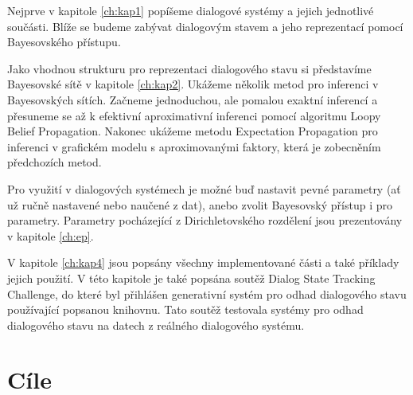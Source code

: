 Nejprve v kapitole \ref{ch:kap1} popíšeme dialogové systémy a jejich jednotlivé součásti.
Blíže se budeme zabývat dialogovým stavem a jeho reprezentací pomocí Bayesovského přístupu.

Jako vhodnou strukturu pro reprezentaci dialogového stavu si představíme Bayesovské sítě v kapitole \ref{ch:kap2}.
Ukážeme několik metod pro inferenci v Bayesovských sítích.
Začneme jednoduchou, ale pomalou exaktní inferencí a přesuneme se až k efektivní aproximativní inferenci pomocí algoritmu Loopy Belief Propagation.
Nakonec ukážeme metodu Expectation Propagation pro inferenci v grafickém modelu s aproximovanými faktory, která je zobecněním předchozích metod.

Pro využití v dialogových systémech je možné buď nastavit pevné parametry (ať už ručně nastavené nebo naučené z dat), anebo zvolit Bayesovský přístup i pro parametry.
Parametry pocházející z Dirichletovského rozdělení jsou prezentovány v kapitole \ref{ch:ep}.

V kapitole \ref{ch:kap4} jsou popsány všechny implementované části a také příklady jejich použití.
V této kapitole je také popsána soutěž Dialog State Tracking Challenge, do které byl přihlášen generativní systém pro odhad dialogového stavu používající popsanou knihovnu.
Tato soutěž testovala systémy pro odhad dialogového stavu na datech z reálného dialogového systému.

\section*{Cíle}


